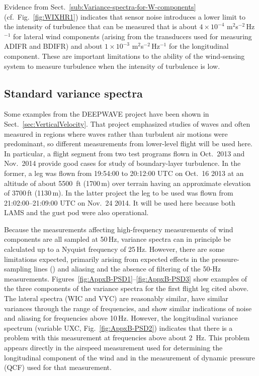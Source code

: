 \documentclass[12pt,twoside,english]{article}\usepackage[]{graphicx}\usepackage[]{color}
\let\OrgIndex\index
\renewcommand*{\index}[1]{\OrgIndex{#1}}
\begin{document}
{{Evidence from Sect.~\ref{sub:Variance-spectra-for-W-components} (cf.~Fig.~\ref{fig:WIXHR1}) indicates that sensor noise introduces a lower limit to the intensity of turbulence that can be measured that is about $4\times10^{-4}$ m$^{2}$s$^{-2}$\,Hz$^{-1}$ for lateral wind components (arising from the transducers used for measuring ADIFR and BDIFR) and about $1\times10^{-3}$ m$^{2}$s$^{-2}$\,Hz$^{-1}$ for the longitudinal component. These are important limitations to the ability of the wind-sensing system to measure turbulence when the intensity of turbulence is low. 


\subsection{Standard variance spectra\label{sub:var-spec}}

Some examples from the DEEPWAVE project have been shown in Sect.~\ref{sec:VerticalVelocity}. That project emphasized studies of waves and often measured in regions where waves rather than turbulent air motions were predominant, so different measurements from lower-level flight will be used here. In particular, a flight segment from two test programs flown in Oct.~2013 and Nov.~2014 provide good cases for study of boundary-layer turbulence. In the former, a leg was flown from 19:54:00 to 20:12:00 UTC on Oct.~16 2013 at an altitude of about 5500~ft (1700\,m) over terrain having an approximate elevation of 3700\,ft (1130\,m). In the latter project the leg to be used was flown from 21:02:00--21:09:00 UTC on Nov.~24 2014. It will be used here because both LAMS and the gust pod were also operational. 



Because the measurements affecting high-frequency measurements of wind components are all sampled at 50\,Hz, variance spectra can in principle be calculated up to a Nyquist frequency of 25\,Hz. However, there are some limitations expected, primarily arising from expected effects in the pressure-sampling lines (\citet{Iberall1950}) and aliasing and the absence of filtering of the 50-Hz measurements. Figures\ \ref{fig:AppxB-PSD1}--\ref{fig:AppxB-PSD3} show examples of the three components of the variance spectra for the first flight leg cited above. The lateral spectra (WIC and VYC) are reasonably similar, have similar variances through the range of frequencies, and show similar indications of noise and aliasing for frequencies above 10\,Hz. However, the longitudinal variance spectrum (variable UXC, Fig.~\ref{fig:AppxB-PSD2}) indicates that there is a problem with this measurement at frequencies above about 2~Hz. This problem appears directly in the airspeed measurement used for determining the longitudinal component of the wind and in the measurement of dynamic pressure (QCF) used for that measurement. 

}}
\end{document}
